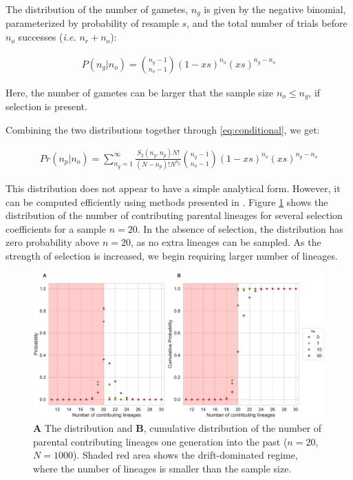 \documentclass[review]{elsarticle}
\begin{document}
The distribution of the number of gametes, $n_g$ is given by the negative binomial, parameterized by
probability of resample $s$, and the total number of trials before $n_o$ successes (\textit{i.e.}
$n_r+n_o$):

\begin{align}
  \label{eq:neg-binomial-trials}
  P(n_g|n_o) = \binom{n_g-1}{n_o-1}(1-xs)^{n_o}(xs)^{n_g-n_o}
\end{align}

Here, the number of gametes can be larger that the sample size $n_o \le n_g$, if selection is present.

Combining the two distributions together through \ref{eq:conditional}, we get:

\begin{align}
  \label{eq:lineages-in-past}
   Pr(n_p|n_o) = \sum_{n_g=1}^{\infty} \frac{S_2(n_g,n_p) N!}{(N-n_p)! N^{n_g}} \binom{n_g-1}{n_o-1}(1-xs)^{n_o}(xs)^{n_g-n_o}
\end{align}

This distribution does not appear to have a simple analytical form. However, it can be computed
efficiently using methods presented in \citep{ONeill2019}. Figure \ref{fig:sampling-dist} shows the
distribution of the number of contributing parental lineages for several selection coefficients for
a sample $n=20$. In the absence of selection, the distribution has zero probability above $n=20$, as
no extra lineages can be sampled. As the strength of selection is increased, we begin requiring
larger number of lineages.

\begin{figure}
  \centering
  \includegraphics[width=\textwidth]{fig/distributions.pdf}
  \caption{\textbf{A} The distribution and \textbf{B}, cumulative distribution of the number of
    parental contributing lineages one generation into the past ($n=20$, $N=1000$). Shaded red area
    shows the drift-dominated regime, where the number of lineages is smaller than the sample size.}
  \label{fig:sampling-dist}
\end{figure}
\end{document}
